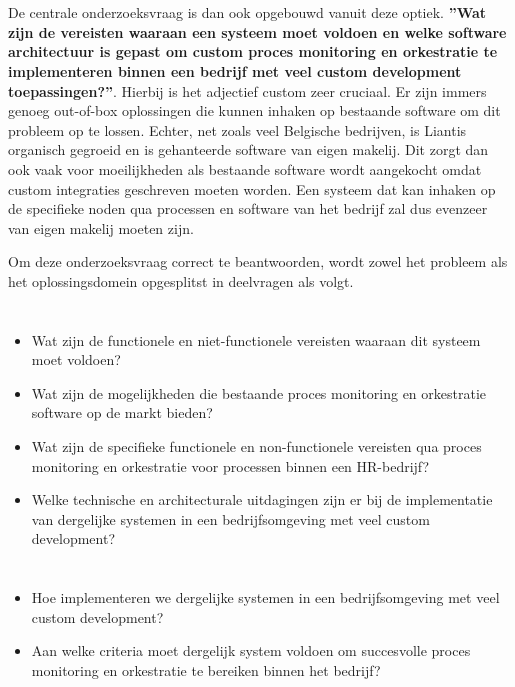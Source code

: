 \section{}%
\label{sec:onderzoeksvraag}

De centrale onderzoeksvraag is dan ook opgebouwd vanuit deze optiek. \textbf{”Wat zijn de vereisten waaraan een systeem moet voldoen en welke software architectuur is gepast om custom proces monitoring en orkestratie te implementeren binnen een bedrijf met veel custom development toepassingen?”}. Hierbij is het adjectief custom zeer cruciaal. Er zijn immers genoeg out-of-box oplossingen die kunnen inhaken op bestaande software om dit probleem op te lossen. Echter, net zoals veel Belgische bedrijven, is Liantis organisch gegroeid en is gehanteerde software van eigen makelij. Dit zorgt dan ook vaak voor moeilijkheden als bestaande software wordt aangekocht omdat custom integraties geschreven moeten worden. Een systeem dat kan inhaken op de specifieke noden qua processen en software van het bedrijf zal dus evenzeer van eigen makelij moeten zijn.\newline

Om deze onderzoeksvraag correct te beantwoorden, wordt zowel het probleem als het oplossingsdomein opgesplitst in deelvragen als volgt.

\section{}%
\label{sec:probleemdomein}
\begin{itemize}
  \item Wat zijn de functionele en niet-functionele vereisten waaraan dit systeem moet voldoen?
  \item Wat zijn de mogelijkheden die bestaande proces monitoring en orkestratie software op de markt bieden?
  \item Wat zijn de specifieke functionele en non-functionele vereisten qua proces monitoring en orkestratie voor processen binnen een HR-bedrijf?
  \item Welke technische en architecturale uitdagingen zijn er bij de implementatie van dergelijke systemen in een bedrijfsomgeving met veel custom development?
\end{itemize}

\section{}%
\label{sec:oplossingsdomein}
\begin{itemize}
  \item Hoe implementeren we dergelijke systemen in een bedrijfsomgeving met veel custom development?
  \item Aan welke criteria moet dergelijk system voldoen om succesvolle proces monitoring en orkestratie te bereiken binnen het bedrijf?
\end{itemize}

